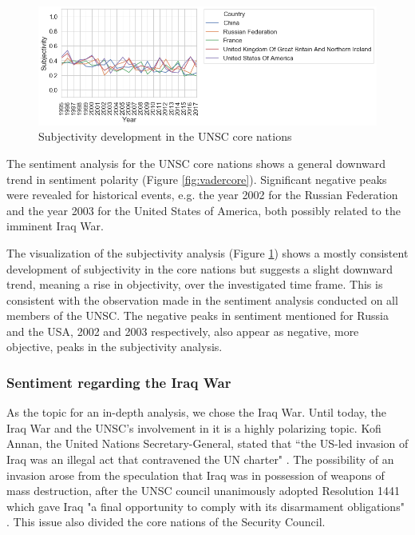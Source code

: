 \begin{figure}[t]
  \centering
  \includegraphics[width=14.75cm]{img/over_time_Blob_Subjectivityy.png}
  \caption{Subjectivity development in the UNSC core nations}
  \label{fig:subjcore}
\end{figure}%

The sentiment analysis for the UNSC core nations shows a general downward trend in sentiment polarity (Figure \ref{fig:vadercore}). Significant negative peaks were revealed for historical events, e.g. the year 2002 for the Russian Federation and the year 2003 for the United States of America, both possibly related to the imminent Iraq War.

The visualization of the subjectivity analysis (Figure  \ref{fig:subjcore}) shows a mostly consistent development of subjectivity in the core nations but suggests a slight downward trend, meaning a rise in objectivity, over the investigated time frame. This is consistent with the observation made in %
the sentiment analysis conducted on all members of the UNSC. The negative peaks in sentiment mentioned for Russia and the USA, 2002 and 2003 respectively, also appear as negative, more objective, peaks in the subjectivity analysis.

\subsubsection{Sentiment regarding the Iraq War}
As the topic for an in-depth analysis, we chose the Iraq War. Until today, the Iraq War and the UNSC's involvement in it is a highly polarizing topic. Kofi Annan, the United Nations Secretary-General, stated that ``the US-led invasion of Iraq was an illegal act that contravened the UN charter" \citep{bbciraq}.
The possibility of an invasion arose from the speculation that Iraq was in possession of weapons of mass destruction, after the UNSC council unanimously adopted Resolution 1441 which gave Iraq "a final opportunity to comply with its disarmament obligations" \citep{resolution1441}.
This issue also divided the core nations of the Security Council.

